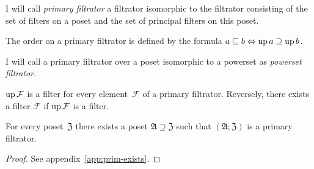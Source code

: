 \begin{defn}
I will call \emph{primary filtrator} a filtrator isomorphic to the
filtrator consisting of the set of filters on a poset and the set
of principal filters on this poset.\end{defn}
\begin{obvious}
The order on a primary filtrator is defined by the formula $a\sqsubseteq b\Leftrightarrow\operatorname{up} a\supseteq\operatorname{up} b$.\end{obvious}
\begin{defn}
I will call a primary filtrator over a
poset isomorphic to a powerset as \emph{powerset filtrator}.\end{defn}
\begin{obvious}
$\operatorname{up}\mathcal{F}$ is a filter for every element~$\mathcal{F}$ of
a primary filtrator. Reversely, there exists a filter $\mathcal{F}$
if $\operatorname{up}\mathcal{F}$ is a filter.\end{obvious}
\begin{thm}
\label{thm1:prim-exists}For every poset~$\mathfrak{Z}$ there exists
a poset $\mathfrak{A}\supseteq\mathfrak{Z}$ such that $(\mathfrak{A};\mathfrak{Z})$
is a primary filtrator.\end{thm}
\begin{proof}
See appendix~\ref{app:prim-exists}.
\end{proof}

